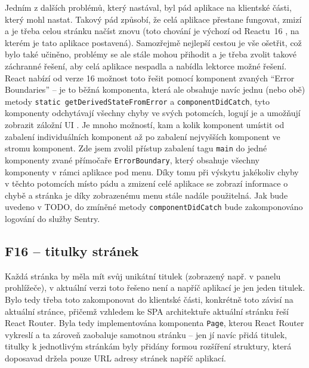 Jedním z dalších problémů, který nastával, byl pád aplikace na klientské části, který mohl nastat. Takový pád způsobí, že celá aplikace přestane fungovat, zmizí a je třeba celou stránku načíst znovu (toto chování je výchozí od Reactu~16 \cite{react-errorboundaries}, na kterém je tato aplikace postavená). Samozřejmě nejlepší cestou je vše ošetřit, což bylo také učiněno, problémy se ale stále mohou přihodit a je třeba zvolit takové záchranné řešení, aby celá aplikace nespadla a nabídla lektorce možné řešení. React nabízí od verze 16 možnost toto řešit pomocí komponent zvaných \enquote{Error Boundaries} -- je to běžná komponenta, která ale obsahuje navíc jednu (nebo obě) metody \verb|static getDerivedStateFromError| a \verb|componentDidCatch|, tyto komponenty odchytávají všechny chyby ve svých potomcích, logují je a umožňují zobrazit záložní UI \cite{react-errorboundaries}. Je mnoho možností, kam a kolik komponent umístit od zabalení individuálních komponent až po zabalení nejvyšších komponent ve stromu komponent. Zde jsem zvolil přístup zabalení tagu \verb|main| do jedné komponenty zvané přímočaře \verb|ErrorBoundary|, který obsahuje všechny komponenty v rámci aplikace pod menu. Díky tomu při výskytu jakékoliv chyby v těchto potomcích místo pádu a zmizení celé aplikace se zobrazí informace o chybě a stránka je díky zobrazenému menu stále nadále použitelná. Jak bude uvedeno v TODO, do zmíněné metody \verb|componentDidCatch| bude zakomponováno logování do služby Sentry.

\subsection{F16 -- titulky stránek}

Každá stránka by měla mít svůj unikátní titulek (zobrazený např. v panelu prohlížeče), v aktuální verzi toto řešeno není a napříč aplikací je jen jeden titulek. Bylo tedy třeba toto zakomponovat do klientské části, konkrétně toto závisí na aktuální stránce, přičemž vzhledem ke SPA architektuře aktuální stránku řeší React Router. Byla tedy implementována komponenta \verb|Page|, kterou React Router vykreslí a ta zároveň zaobaluje samotnou stránku -- jen jí navíc přidá titulek, titulky k jednotlivým stránkám byly přidány formou rozšíření struktury, která doposavad držela pouze URL adresy stránek napříč aplikací.

